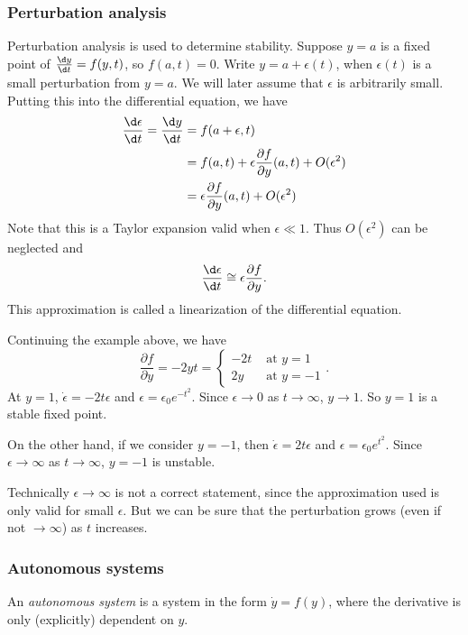\documentclass[a4paper]{article}
\begin{document}
  \subsubsection{Perturbation analysis}
  Perturbation analysis is used to determine stability. Suppose $y = a$ is a fixed point of $\frac{\d y}{\d t} = f(y, t)$, so $f(a, t) = 0$. Write $y = a + \epsilon(t)$, when $\epsilon(t)$ is a small perturbation from $y = a$. We will later assume that $\epsilon$ is arbitrarily small. Putting this into the differential equation, we have
  \begin{align*}
    \frac{\d \epsilon}{\d t} = \frac{\d y}{\d t} &= f(a + \epsilon, t)\\
    &= f(a, t) + \epsilon\frac{\partial f}{\partial y}(a, t) + O(\epsilon^2)\\
    &= \epsilon\frac{\partial f}{\partial y}(a, t) + O(\epsilon^2)
  \end{align*}
  Note that this is a Taylor expansion valid when $\epsilon \ll 1$. Thus $O(\epsilon^2)$ can be neglected and
  \[
    \frac{\d \epsilon}{\d t} \cong \epsilon\frac{\partial f}{\partial y}.
  \]
  This approximation is called a linearization of the differential equation.
  \begin{eg}
    Continuing the example above, we have
    \[
      \frac{\partial f}{\partial y} = -2yt =
      \begin{cases}
        -2t & \text{ at } y = 1\\
        2y & \text{ at } y = -1
      \end{cases}.
    \]
    At $y = 1$, $\dot{\epsilon} = -2t\epsilon$ and $\epsilon = \epsilon_0 e^{-t^2}$. Since $\epsilon \to 0$ as $t \to \infty$, $y \to 1$. So $y = 1$ is a stable fixed point.

    On the other hand, if we consider $y = -1$, then $\dot\epsilon = 2t\epsilon$ and $\epsilon = \epsilon_0 e^{t^2}$. Since $\epsilon \to \infty$ as $t\to \infty$, $y = -1$ is unstable.

    \note Technically $\epsilon \to \infty$ is not a correct statement, since the approximation used is only valid for small $\epsilon$. But we can be sure that the perturbation grows (even if not $\to \infty$) as $t$ increases.
  \end{eg}

  \subsubsection{Autonomous systems}
  \begin{defi}
    An \emph{autonomous system} is a system in the form $\dot y = f(y)$, where the derivative is only (explicitly) dependent on $y$.
  \end{defi}
\end{document}
